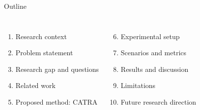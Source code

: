 \begin{frame}{Outline}
\begin{columns}[T,onlytextwidth]
\begin{enumerate}
    \item Research context
    \item Problem statement
    \item Research gap and questions
    \item Related work
    \item Proposed method: CATRA
\end{enumerate}

\begin{enumerate}
    \setcounter{enumi}{5}
    \item Experimental setup
    \item Scenarios and metrics
    \item Results and discussion
    \item Limitations
    \item Future research direction
\end{enumerate}
\end{columns}
\end{frame}
